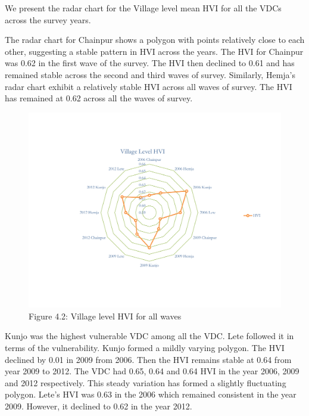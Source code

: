 \documentclass[12pt, a4paper]{article}
\begin{document}
We present the radar chart for the Village level mean HVI for all the VDCs across the survey years.

The radar chart for Chainpur shows a polygon with points relatively close to each other, suggesting a stable pattern in HVI across the years. The HVI for Chainpur was 0.62 in the first wave of the survey. The HVI then declined to 0.61 and has remained stable across the second and third waves of survey. Similarly, Hemja's radar chart exhibit a relatively stable HVI across all waves of survey. The HVI has remained at 0.62 across all the waves of survey. \vspace{-1.5cm}
\begin{center}
\begin{figure}[H]
	\includegraphics[scale=0.62]{HVI_Summary_VDC1.pdf}
	\vspace{-1.5cm}
		\captionsetup{labelformat=empty}
			\caption{Figure 4.2: Village level HVI for all waves} 
	\label{fig:vdclevelhvi}
	\setlength{\belowcaptionskip}{6pt}
	\label{fig:conceptualfw}
\end{figure}
\end{center}
\vspace{-0.5cm}
Kunjo was the highest vulnerable VDC among all the VDC. Lete followed it in terms of the vulnerability. Kunjo formed a mildly varying polygon. The HVI declined by 0.01 in 2009 from 2006. Then the HVI remains stable at 0.64 from year 2009 to 2012. The VDC had 0.65, 0.64 and 0.64 HVI in the year 2006, 2009 and 2012 respectively. This steady variation has formed a slightly fluctuating polygon.  Lete's HVI was 0.63 in the 2006 which remained consistent in the year 2009. However, it declined to 0.62 in the year 2012.   
\end{document}
